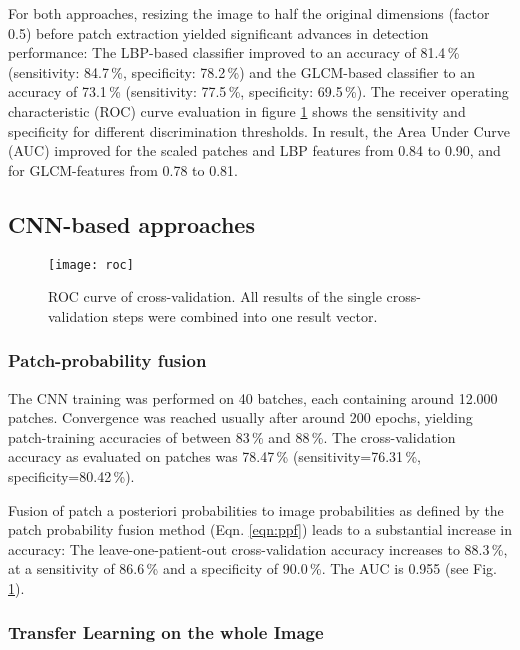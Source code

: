 \documentclass[fleqn,10pt]{wlscirep}
\begin{document}
For both approaches,
resizing the image to half the original dimensions (factor 0.5)
before patch extraction yielded significant advances in detection
performance: The LBP-based classifier improved to an accuracy of
81.4\,\% (sensitivity: 84.7\,\%, specificity: 78.2\,\%) and the
GLCM-based classifier to an accuracy of 73.1\,\% (sensitivity: 77.5\,\%,
specificity: 69.5\,\%). The receiver operating characteristic (ROC) curve evaluation in figure
\ref{fig:roc} shows the sensitivity and specificity for different discrimination thresholds. In result, the Area Under Curve (AUC) improved for the scaled
patches and LBP features from 0.84 to 0.90, and for GLCM-features from
0.78 to 0.81.


\subsection{CNN-based approaches}


\begin{figure}
\centering
\texttt{[image: roc]}
\caption{ROC curve of cross-validation. All results of the single
cross-validation steps were combined into one result vector. }
\label{fig:roc}
\end{figure}

\subsubsection*{Patch-probability fusion}



The CNN training was performed on 40 batches, each containing around 12.000
patches. Convergence was reached usually after around 200 epochs, yielding
patch-training accuracies of between 83\,\% and 88\,\%. The cross-validation accuracy as evaluated on patches was 78.47\,\%
(sensitivity=76.31\,\%, specificity=80.42\,\%). 



Fusion of patch a posteriori 
probabilities to image probabilities as defined by the patch probability fusion method (Eqn. \ref{eqn:ppf}) leads to a
substantial increase in accuracy: The leave-one-patient-out
cross-validation accuracy increases to 88.3\,\%, at a sensitivity of
86.6\,\% and a specificity of 90.0\,\%. The AUC
is 0.955 (see Fig. \ref{fig:roc}). 



\subsubsection*{Transfer Learning on the whole Image}
\end{document}
